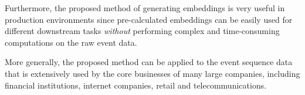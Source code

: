 \documentclass[sigconf, anonymous]{acmart}
\begin{document}
Furthermore, the proposed method of generating embeddings is very useful in production environments since pre-calculated embeddings can be easily used for different downstream tasks \emph{without} performing complex and time-consuming computations on the raw event data.

More generally, the proposed method can be applied to the event sequence data that is extensively used by the core businesses of many large companies, including financial institutions, internet companies, retail and telecommunications.

\end{document}
